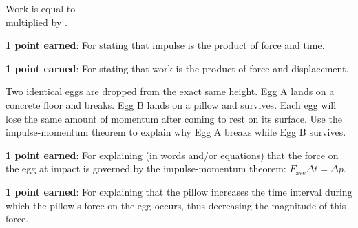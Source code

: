 \documentclass[answers]{exam}
\begin{document}
\begin{questions}
\begin{center}
\begin{minipage}{0.6\textwidth}
    Work is equal to\\[1ex] \fillin[force][3cm] multiplied by \fillin[displacement][3cm].
\end{minipage}%
\end{center}

\begin{solution}

\textbf{\color{red} 1 point earned}: For stating that impulse is the product of force and time.

\textbf{\color{red} 1 point earned}: For stating that work is the product of force and displacement.
\end{solution}


\question[2]
Two identical eggs are dropped from the exact same height. Egg A lands on a concrete floor and breaks. Egg B lands on a pillow and survives. Each egg will lose the same amount of momentum after coming to rest on its surface. Use the impulse-momentum theorem to explain why Egg A breaks while Egg B survives.

\ifprintanswers
\else
\fillwithlines{3cm}
\fi

\begin{solution}

\textbf{\color{red} 1 point earned}: For explaining (in words and/or equations) that the force on the egg at impact is governed by the impulse-momentum theorem: $F_\mathrm{ave} \Delta t = \Delta p$.

 \textbf{\color{red} 1 point earned}: For explaining that the pillow increases the time interval during which the pillow's force on the egg occurs, thus decreasing the magnitude of this force.


\end{solution}
\end{questions}
\end{document}
